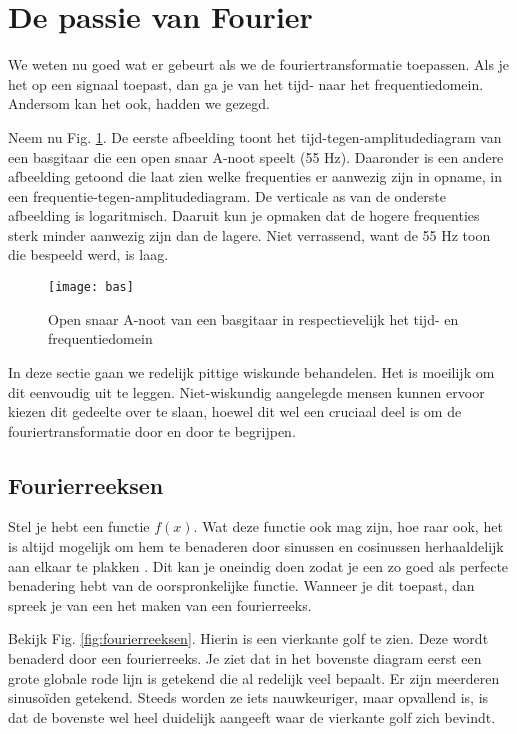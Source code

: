 \documentclass[11pt,fleqn]{book} %
\begin{document}
\section{De passie van Fourier}
We weten nu goed wat er gebeurt als we de fouriertransformatie toepassen. Als je het op een signaal toepast, dan ga je van het tijd- naar het frequentiedomein. Andersom kan het ook, hadden we gezegd.

Neem nu Fig. \ref{fig:bas}. De eerste afbeelding toont het tijd-tegen-amplitudediagram van een basgitaar die een open snaar A-noot speelt (55 Hz). Daaronder is een andere afbeelding getoond die laat zien welke frequenties er aanwezig zijn in opname, in een frequentie-tegen-amplitudediagram. De verticale as van de onderste afbeelding is logaritmisch. Daaruit kun je opmaken dat de hogere frequenties sterk minder aanwezig zijn dan de lagere. Niet verrassend, want de 55 Hz toon die bespeeld werd, is laag.

\begin{figure}[h]
	\centering\texttt{[image: bas]}
	\caption{Open snaar A-noot van een basgitaar in respectievelijk het tijd- en frequentiedomein}
	\label{fig:bas}
\end{figure}

In deze sectie gaan we redelijk pittige wiskunde behandelen. Het is moeilijk om dit eenvoudig uit te leggen. Niet-wiskundig aangelegde mensen kunnen ervoor kiezen dit gedeelte over te slaan, hoewel dit wel een cruciaal deel is om de fouriertransformatie door en door te begrijpen.

\subsection{Fourierreeksen}
Stel je hebt een functie $f(x)$. Wat deze functie ook mag zijn, hoe raar ook, het is altijd mogelijk om hem te benaderen door sinussen en cosinussen herhaaldelijk aan elkaar te plakken \cite{fs}. Dit kan je oneindig doen zodat je een zo goed als perfecte benadering hebt van de oorspronkelijke functie. Wanneer je dit toepast, dan spreek je van een het maken van een fourierreeks.

Bekijk Fig. \ref{fig:fourierreeksen}. Hierin is een vierkante golf te zien. Deze wordt benaderd door een fourierreeks. Je ziet dat in het bovenste diagram eerst een grote globale rode lijn is getekend die al redelijk veel bepaalt. Er zijn meerderen sinusoïden getekend. Steeds worden ze iets nauwkeuriger, maar opvallend is, is dat de bovenste wel heel duidelijk aangeeft waar de vierkante golf zich bevindt.
\end{document}
